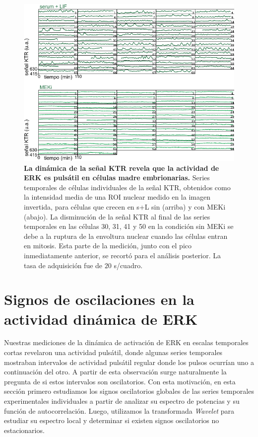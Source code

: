 \documentclass[./main.tex]{subfiles}
\begin{document}
\begin{figure}
    \centering
    \includegraphics[width=1\columnwidth]{figures/chapter2/C2_traces.pdf} 
    \caption{\textbf{La dinámica de la señal KTR revela que la actividad de ERK es pulsátil en células madre embrionarias.} Series temporales de células individuales de la señal KTR, obtenidos como la intensidad media de una ROI nuclear medido en la imagen invertida, para células que crecen en s+L sin (arriba) y con MEKi (abajo). La disminución de la señal KTR al final de las series temporales en las células 30, 31, 41 y 50 en la condición sin MEKi se debe a la ruptura de la envoltura nuclear cuando las células entran en mitosis. Esta parte de la medición, junto con el pico inmediatamente anterior, se recortó para el análisis posterior. La tasa de adquisición fue de $20$ s/cuadro.}
    \label{C2_fig:traces}
\end{figure}




\section{Signos de oscilaciones en la actividad dinámica de ERK}
\label{C2_sec:oscilaciones}

Nuestras mediciones de la dinámica de activación de ERK en escalas temporales cortas revelaron una actividad pulsátil, donde algunas series temporales mostraban intervalos de actividad pulsátil regular donde los pulsos ocurrían uno a continuación del otro. A partir de esta observación surge naturalmente la pregunta de si estos intervalos son oscilatorios. Con esta motivación, en esta sección primero estudiamos los signos oscilatorios globales de las series temporales experimentales individuales a partir de analizar su espectro de potencias y su función de autocorrelación. Luego, utilizamos la transformada \textit{Wavelet} para estudiar su espectro local y determinar si existen signos oscilatorios no estacionarios. 
\end{document}
